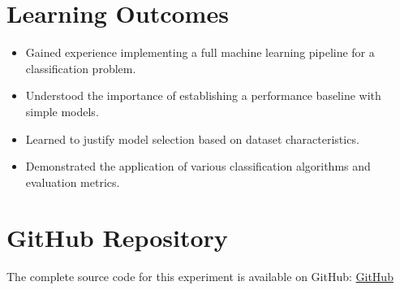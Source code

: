 \documentclass[12pt]{article}
\begin{document}
\section{Learning Outcomes}
\begin{itemize}
    \item Gained experience implementing a full machine learning pipeline for a classification problem.
    \item Understood the importance of establishing a performance baseline with simple models.
    \item Learned to justify model selection based on dataset characteristics.
    \item Demonstrated the application of various classification algorithms and evaluation metrics.
\end{itemize}

\section*{GitHub Repository}
The complete source code for this experiment is available on GitHub:
\href{https://github.com/yuvashreeph/Machine-Learning/tree/main/Assignment3}{GitHub}
\end{document}
